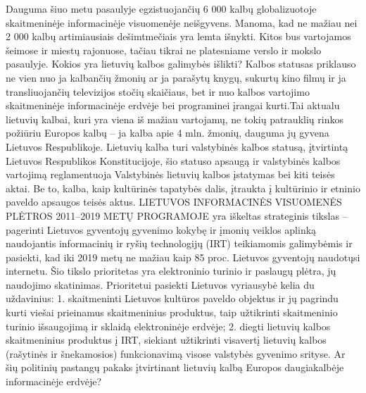 \begin{multicols}{2}
Dauguma šiuo metu pasaulyje egzistuojančių 6 000 kalbų globalizuotoje skaitmeninėje informacinėje visuomenėje neišgyvens. Manoma, kad ne mažiau nei 2 000 kalbų artimiausiais dešimtmečiais yra lemta išnykti. Kitos bus vartojamos šeimose ir miestų rajonuose, tačiau tikrai ne platesniame verslo ir mokslo pasaulyje. Kokios yra lietuvių kalbos galimybės išlikti? Kalbos statusas priklauso ne vien nuo ja kalbančių žmonių ar ja parašytų knygų, sukurtų kino filmų ir ja transliuojančių televizijos stočių skaičiaus, bet ir nuo kalbos vartojimo skaitmeninėje informacinėje erdvėje bei programinei įrangai kurti.Tai aktualu lietuvių kalbai, kuri yra viena iš mažiau vartojamų, ne tokių patrauklių rinkos požiūriu Europos kalbų – ja kalba apie 4 mln. žmonių, dauguma jų gyvena Lietuvos Respublikoje. Lietuvių kalba turi valstybinės kalbos statusą, įtvirtintą Lietuvos Respublikos Konstitucijoje, šio statuso apsaugą ir valstybinės kalbos vartojimą reglamentuoja Valstybinės lietuvių kalbos įstatymas bei kiti teisės aktai. Be to, kalba, kaip kultūrinės tapatybės dalis, įtraukta į kultūrinio ir etninio paveldo apsaugos teisės aktus. LIETUVOS INFORMACINĖS VISUOMENĖS PLĖTROS 2011–2019 METŲ PROGRAMOJE yra iškeltas strateginis tikslas – pagerinti Lietuvos gyventojų gyvenimo kokybę ir įmonių veiklos aplinką naudojantis informacinių ir ryšių technologijų (IRT) teikiamomis galimybėmis ir pasiekti, kad iki 2019 metų ne mažiau kaip 85 proc. Lietuvos gyventojų naudotųsi internetu. Šio tikslo prioritetas yra elektroninio turinio ir paslaugų plėtra, jų naudojimo skatinimas. Prioritetui pasiekti Lietuvos vyriausybė kelia du uždavinius: 1. skaitmeninti Lietuvos kultūros paveldo objektus ir jų pagrindu kurti viešai prieinamus skaitmeninius produktus, taip užtikrinti skaitmeninio turinio išsaugojimą ir sklaidą elektroninėje erdvėje; 2. diegti lietuvių kalbos skaitmeninius produktus į IRT, siekiant užtikrinti visavertį lietuvių kalbos (rašytinės ir šnekamosios) funkcionavimą visose valstybės gyvenimo srityse. Ar šių politinių pastangų pakaks įtvirtinant lietuvių kalbą Europos daugiakalbėje informacinėje erdvėje? 


\end{multicols}
